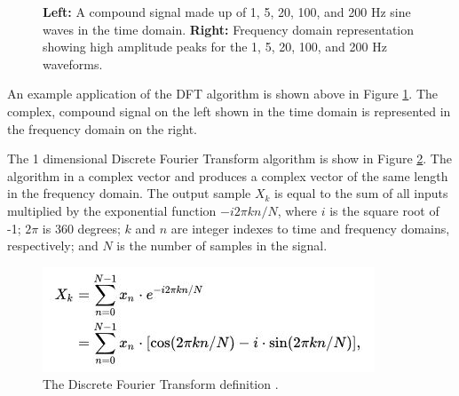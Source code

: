 \documentclass[11pt,a4paper]{article}
\begin{document}
\begin{figure}[H]%
    \centering
    \qquad
    \vspace{5pt}
    \caption{\textbf{Left:} A compound signal made up of 1, 5, 20, 100, and 200 Hz sine waves in the time domain. \textbf{Right:} Frequency domain representation showing high amplitude peaks for the 1, 5, 20, 100, and 200 Hz waveforms.}%
    \label{fig:dft_demo}%
\end{figure}

An example application of the DFT algorithm is shown above in Figure \ref{fig:dft_demo}. The complex, compound signal on the left shown in the time domain is represented in the frequency domain on the right.

The 1 dimensional Discrete Fourier Transform algorithm is show in Figure \ref{fig:dft_algorithm}. The algorithm in a complex vector and produces a complex vector of the same length in the frequency domain. The output sample $X_{k}$ is equal to the sum of all inputs multiplied by the exponential function $-i2$$\pi$$kn/N$, where $i$ is the square root of -1; $2$$\pi$ is 360 degrees; $k$ and $n$ are integer indexes to time and frequency domains, respectively; and $N$ is the number of samples in the signal.

\begin{figure}[H]
\begin{center}
\includegraphics[scale=1]{dft_algorithm}
\end{center}
\caption{The Discrete Fourier Transform definition \citep{wikipedia:dft}.}
\label{fig:dft_algorithm}
\end{figure}
\end{document}
